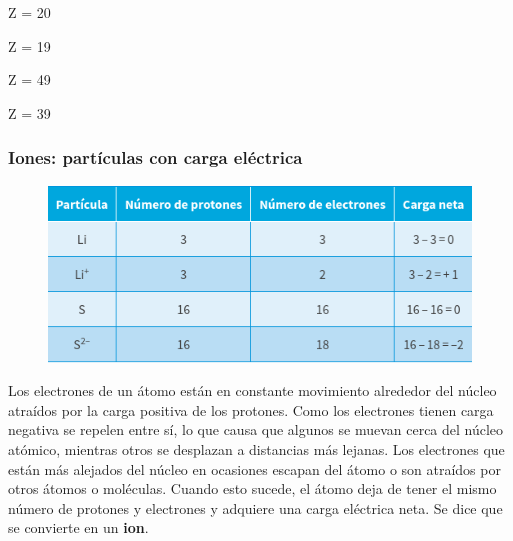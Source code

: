 \documentclass[11pt]{book}
\begin{document}
\begin{boxK}
\begin{enumerate}
          \begin{hoptboxes}
            \item Z = 20
            \item Z = 19
            \item Z = 49
            \item Z = 39
          \end{hoptboxes}

  \end{enumerate}

\end{boxK}

\subsubsection{Iones: partículas con carga eléctrica}

\begin{figure}[H]
  \centering
  \includegraphics[width=0.7\linewidth]{tabla_de_cargas.png}
  \label{tab:tabla_de_cargas}
\end{figure}%

Los electrones de un átomo están en constante movimiento alrededor del núcleo atraídos por la carga positiva
de los protones. Como los electrones tienen carga negativa se repelen entre sí, lo que causa que algunos se
muevan cerca del núcleo atómico, mientras otros se desplazan a distancias más lejanas. Los electrones que están
más alejados del núcleo en ocasiones escapan del átomo o son atraídos por otros átomos o moléculas. Cuando esto
sucede, el átomo deja de tener el mismo número de protones y electrones y adquiere una carga eléctrica neta.
Se dice que se convierte en un \textbf{ion}.
\end{document}
